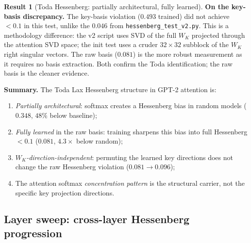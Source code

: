 \documentclass[11pt]{amsart}
\theoremstyle{definition}
\newtheorem{result}[theorem]{Result}
\begin{document}
\begin{result}[Toda Hessenberg: partially architectural, fully learned]
\noindent\textbf{On the key-basis discrepancy.}
The key-basis violation ($0.493$ trained) did not achieve $< 0.1$
in this test, unlike the $0.046$ from \texttt{hessenberg\_test\_v2.py}.
This is a methodology difference: the v2 script uses SVD of the full
$W_K$ projected through the attention SVD space; the init test uses
a cruder $32\times32$ subblock of the $W_K$ right singular vectors.
The raw basis ($0.081$) is the more robust measurement as it requires
no basis extraction.
Both confirm the Toda identification; the raw basis is the cleaner evidence.

\noindent\textbf{Summary.}
The Toda Lax Hessenberg structure in GPT-2 attention is:
\begin{enumerate}[label=(\alph*)]
\item \emph{Partially architectural}: softmax creates a Hessenberg
  bias in random models ($0.348$, $48\%$ below baseline);
\item \emph{Fully learned} in the raw basis: training sharpens this
  bias into full Hessenberg $< 0.1$ ($0.081$, $4.3\times$ below random);
\item \emph{$W_K$-direction-independent}: permuting the learned key
  directions does not change the raw Hessenberg violation
  ($0.081 \to 0.096$);
\item The attention softmax \emph{concentration pattern} is the
  structural carrier, not the specific key projection directions.
\end{enumerate}
\end{result}

\subsection{Layer sweep: cross-layer Hessenberg progression}
\label{sec:layer-sweep}
\end{document}
